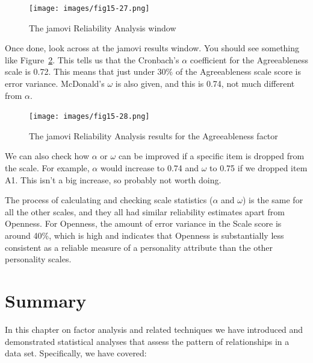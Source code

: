 \documentclass[
  a4paper,
]{book}
\begin{document}
\begin{figure}

\texttt{[image: images/fig15-27.png]} \hfill{}

\caption{\label{fig-fig15-27}The jamovi Reliability Analysis window}

\end{figure}

Once done, look across at the jamovi results window. You should see
something like Figure~\ref{fig-fig15-28}. This tells us that the
Cronbach's \(\alpha\) coefficient for the Agreeableness scale is 0.72.
This means that just under 30\% of the Agreeableness scale score is
error variance. McDonald's \(\omega\) is also given, and this is 0.74,
not much different from \(\alpha\).

\begin{figure}

\texttt{[image: images/fig15-28.png]} \hfill{}

\caption{\label{fig-fig15-28}The jamovi Reliability Analysis results for
the Agreeableness factor}

\end{figure}

We can also check how \(\alpha\) or \(\omega\) can be improved if a
specific item is dropped from the scale. For example, \(\alpha\) would
increase to 0.74 and \(\omega\) to 0.75 if we dropped item A1. This
isn't a big increase, so probably not worth doing.

The process of calculating and checking scale statistics (\(\alpha\) and
\(\omega\)) is the same for all the other scales, and they all had
similar reliability estimates apart from Openness. For Openness, the
amount of error variance in the Scale score is around 40\%, which is
high and indicates that Openness is substantially less consistent as a
reliable measure of a personality attribute than the other personality
scales.

\hypertarget{summary-1}{%
\section{Summary}\label{summary-1}}

In this chapter on factor analysis and related techniques we have
introduced and demonstrated statistical analyses that assess the pattern
of relationships in a data set. Specifically, we have covered:
\end{document}
